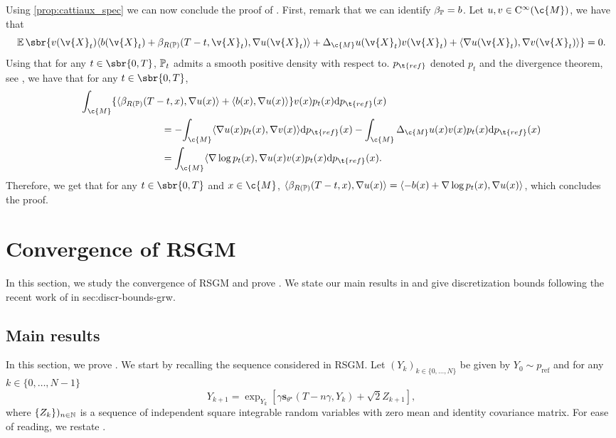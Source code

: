 Using \cref{prop:cattiaux_spec} we can now conclude the proof of .
First, remark that we can identify \(\beta_{\bb{P}} = b\).
Let \(u, v \in \mathrm{C}^\infty(\c{M})\), we have that \begin{equation} \label{eq:equality_fin} \E\sbr{v(\v{X}_t) \langle b(\v{X}_t) + \beta_{R(\bb{P})}(T-t, \v{X}_t), \nabla u(\v{X}_t) \rangle + \Delta_\c{M} u(\v{X}_t) v(\v{X}_t)+ \langle \nabla u(\v{X}_t) , \nabla v(\v{X}_t) \rangle } = 0 .
\end{equation}
Using that for any \(t \in \sbr{0,T}\), \(\bb{P}_t\) admits a smooth positive density with respect to.
\(p_{\t{ref}}\) denoted \(p_t\) and the divergence theorem, see \parencite[p.51]{lee2018introduction}, we have that for any \(t \in \sbr{0,T}\), \begin{align}   & {\int_{\c{M}} \{ \langle \beta_{R(\bb{P})}(T-t, x), \nabla u(x) \rangle + \langle b(x), \nabla u(x) \rangle \} v(x) p_t(x) \mathrm{d} p_{\t{ref}}(x)} \\ & \qquad \qquad \qquad \qquad = - {\int_\c{M} \langle \nabla u(x) p_t(x), \nabla v(x) \rangle \mathrm{d} p_{\t{ref}}(x) - \int_\c{M} \Delta_\c{M} u (x) v(x) p_t(x) \mathrm{d} p_{\t{ref}}(x) } \\ & \qquad \qquad \qquad \qquad = {\int_\c{M} \langle \nabla \log p_t(x), \nabla u(x) v(x) p_t(x)\mathrm{d} p_{\t{ref}}(x) } .
\end{align}
Therefore, we get that for any \(t \in \sbr{0,T}\) and \(x \in \c{M}\), \(\langle \beta_{R(\bb{P})}(T-t, x), \nabla u(x) \rangle = \langle -b(x) + \nabla\log p_t(x), \nabla u(x) \rangle\), which concludes the proof.

\section{Convergence of RSGM}
\label{sec:convergence-rsgm}

In this section, we study the convergence of RSGM and prove .
We state our main results in  and give discretization bounds following the recent work of \textcite{cheng2022theorymanifold} in {sec:discr-bounds-grw}.

\subsection{Main results}
\label{sec:main-results}

In this section, we prove .
We start by recalling the sequence considered in RSGM.
Let \((Y_k)_{k \in \{0, \dots, N\}}\) be given by \(Y_0 \sim p_{\mathrm{ref}}\) and for any \(k \in \{0, \dots, N-1\}\) \begin{equation} Y_{k+1} = \exp_{Y_k}[\gamma \mathbf{s}_{\theta^\star}(T - n\gamma, Y_k) + \sqrt{2} Z_{k+1}] , \end{equation} where \(\{Z_k\})_{n \in \mathbb{N}}\) is a sequence of independent square integrable random variables with zero mean and identity covariance matrix.
For ease of reading, we restate .

